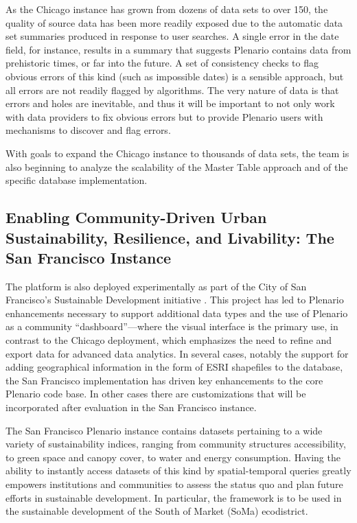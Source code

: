 \documentclass[11pt]{article}
\begin{document}
As the Chicago instance has grown from dozens of data sets to over 150, the quality of source data has been more readily exposed due to the automatic data set summaries produced in response to user searches. A single error in the date field, for instance, results in a summary that suggests Plenario contains data from prehistoric times, or far into the future. A set of consistency checks to flag obvious errors of this kind (such as impossible dates) is a sensible approach, but all errors are not readily flagged by algorithms. The very nature of data is that errors and holes are inevitable, and thus it will be important to not only work with data providers to fix obvious errors but to provide Plenario users with mechanisms to discover and flag errors. 

With goals to expand the Chicago instance to thousands of data sets, the team is also beginning to analyze the scalability of the Master Table approach and of the specific database implementation.

\subsection{\textbf{Enabling Community-Driven Urban Sustainability, Resilience, and Livability: The San Francisco Instance}}\label{san-francisco-instance}
The platform is also deployed experimentally as part of the City of San Francisco's Sustainable Development initiative \cite{sf-sustainable-systems}. This project has led to Plenario enhancements necessary to support additional data types and the use of Plenario as a community ``dashboard''---where the visual interface is the primary use, in contrast to the Chicago deployment, which emphasizes the need to refine and export data for advanced data analytics. In several cases, notably the support for adding geographical information in the form of ESRI shapefiles to the database, the San Francisco implementation has driven key enhancements to the core Plenario code base. In other cases there are customizations that will be incorporated after evaluation in the San Francisco instance.

The San Francisco Plenario instance contains datasets pertaining to a wide variety of sustainability indices, ranging from community structures accessibility, to green space and canopy cover, to water and energy consumption. Having the ability to instantly access datasets of this kind by spatial-temporal queries greatly empowers institutions and communities to assess the status quo and plan future efforts in sustainable development. In particular, the framework is to be used in the sustainable development of the South of Market (SoMa) ecodistrict.
\end{document}
